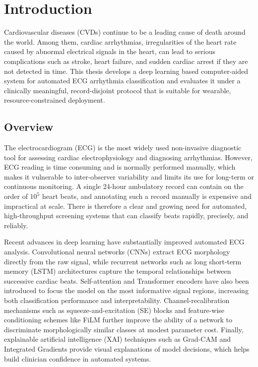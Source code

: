 
\chapter{Introduction}
\label{ch:introduction}

Cardiovascular diseases (CVDs) continue to be a leading cause of death
around the world. Among them, cardiac arrhythmias, irregularities of the
heart rate caused by abnormal electrical signals in the heart, can lead to
serious complications such as stroke, heart failure, and sudden cardiac
arrest if they are not detected in time. This thesis develops a deep
learning based computer-aided system for automated ECG arrhythmia
classification and evaluates it under a clinically meaningful,
record-disjoint protocol that is suitable for wearable, resource-constrained
deployment.


\section{Overview}
\label{sec:overview}

The electrocardiogram (ECG) is the most widely used non-invasive diagnostic
tool for assessing cardiac electrophysiology and diagnosing arrhythmias.
However, ECG reading is time consuming and is normally performed manually,
which makes it vulnerable to inter-observer variability and limits its use
for long-term or continuous monitoring. A single 24-hour ambulatory record
can contain on the order of $10^{5}$ heart beats, and annotating such a
record manually is expensive and impractical at scale. There is therefore a
clear and growing need for automated, high-throughput screening systems that
can classify beats rapidly, precisely, and reliably.

Recent advances in deep learning have substantially improved automated ECG
analysis. Convolutional neural networks (CNNs) extract ECG morphology
directly from the raw signal, while recurrent networks such as long
short-term memory (LSTM) architectures capture the temporal relationships
between successive cardiac beats. Self-attention and Transformer encoders
have also been introduced to focus the model on the most informative signal
regions, increasing both classification performance and interpretability.
Channel-recalibration mechanisms such as squeeze-and-excitation (SE) blocks
and feature-wise conditioning schemes like FiLM further improve the ability
of a network to discriminate morphologically similar classes at modest
parameter cost. Finally, explainable artificial intelligence (XAI)
techniques such as Grad-CAM and Integrated Gradients provide visual
explanations of model decisions, which helps build clinician confidence in
automated systems.

